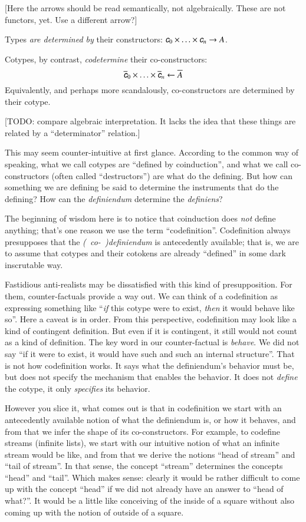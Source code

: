 \documentclass{article}
\begin{document}
[Here the arrows should be read semantically, not algebraically. These
  are not functors, yet. Use a different arrow?]

Types \textit{are determined by} their constructors: \(\ctor{0}\times\ldots\times\ctor{n} \rightarrow A\).

Cotypes, by contrast, \textit{codetermine} their co-constructors:
\[\coctor{0}\times\ldots\times\coctor{n} \leftarrow \cotype{A}\]
Equivalently, and perhaps more scandalously, co-constructors are
determined by their cotype.

[TODO: compare algebraic interpretation. It lacks the idea that these
  things are related by a ``determinator'' relation.]

This may seem counter-intuitive at first glance. According to the
common way of speaking, what we call cotypes are ``defined by
coinduction'', and what we call co-constructors (often called
``destructors'') are what do the defining. But how can something we
are defining be said to determine the instruments that do the
defining? How can the \textit{definiendum} determine the
\textit{definiens}?

The beginning of wisdom here is to notice that coinduction does
\textit{not} define anything; that's one reason we use the term
``codefinition''. Codefinition always presupposes that the
\textit{(~co-~)definiendum} is antecedently available; that is, we are
to assume that cotypes and their cotokens are already ``defined'' in
some dark inscrutable way.

Fastidious anti-realists may be dissatisfied with this kind of
presupposition. For them, counter-factuals provide a way out. We can
think of a codefinition as expressing something like ``\textit{if}
this cotype were to exist, \textit{then} it would behave like so''.
Here a caveat is in order. From this perspective, codefinition may
look like a kind of contingent definition. But even if it is
contingent, it still would not count as a kind of definition. The key
word in our counter-factual is \textit{behave}. We did not say ``if it
were to exist, it would have such and such an internal structure''.
That is not how codefinition works. It says what the definiendum's
behavior must be, but does not specify the mechanism that enables the
behavior. It does not \textit{define} the cotype, it only
\textit{specifies} its behavior.

However you slice it, what comes out is that in codefinition we start
with an antecedently available notion of what the definiendum is, or
how it behaves, and from that we infer the shape of its
co-constructors. For example, to codefine streams (infinite lists), we
start with our intuitive notion of what an infinite stream would be
like, and from that we derive the notions ``head of stream'' and ``tail
of stream''. In that sense, the concept ``stream'' determines the
concepts ``head'' and ``tail''. Which makes sense: clearly it would be
rather difficult to come up with the concept ``head'' if we did not
already have an answer to ``head of what?''. It would be a little
like conceiving of the inside of a square without also coming up with
the notion of outside of a square.
\end{document}
